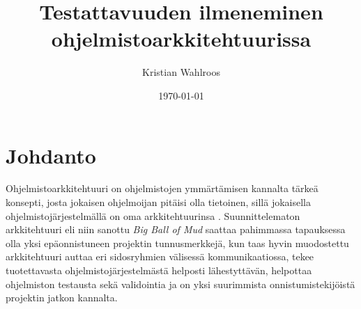 \documentclass[finnish]{tktltiki2}
\title{Testattavuuden ilmeneminen ohjelmistoarkkitehtuurissa}
\author{Kristian Wahlroos}
\date{\today}
\theoremstyle{definition}
\theoremstyle{remark}
\begin{document}

\frontmatter      %

\maketitle        %
\makeabstract     %

\tableofcontents  %


\mainmatter       %

\section{Johdanto}









Ohjelmistoarkkitehtuuri on ohjelmistojen ymmärtämisen kannalta tärkeä konsepti, josta jokaisen ohjelmoijan pitäisi olla tietoinen, sillä jokaisella ohjelmistojärjestelmällä on oma arkkitehtuurinsa \citep[s. 4]{ieee_2000}. Suunnittelematon arkkitehtuuri eli niin sanottu \textit{Big Ball of Mud} saattaa pahimmassa tapauksessa olla yksi epäonnistuneen projektin tunnusmerkkejä, kun taas hyvin muodostettu arkkitehtuuri auttaa eri sidosryhmien välisessä kommunikaatiossa, tekee tuotettavasta ohjelmistojärjestelmästä helposti lähestyttävän, helpottaa ohjelmiston testausta sekä validointia ja on yksi suurimmista onnistumistekijöistä projektin jatkon kannalta. 
\end{document}

